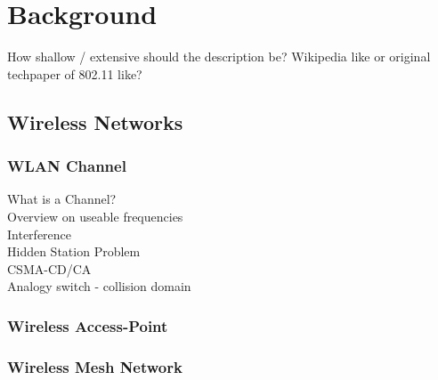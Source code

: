 \chapter{Background}
How shallow / extensive should the description be? Wikipedia like or original techpaper of 802.11 like?
\section{Wireless Networks}
  \subsection{WLAN Channel}
    \begin{description}
    \item[What is a Channel?]
    \item[Overview on useable frequencies]
    \item[Interference]
    \item[Hidden Station Problem]
    \item[CSMA-CD/CA]
    \item[Analogy switch - collision domain]
    \end{description}
  \subsection{Wireless Access-Point}
  \subsection{Wireless Mesh Network}
    \cite{Akyildiz2005445}
    \cite{airberry}
